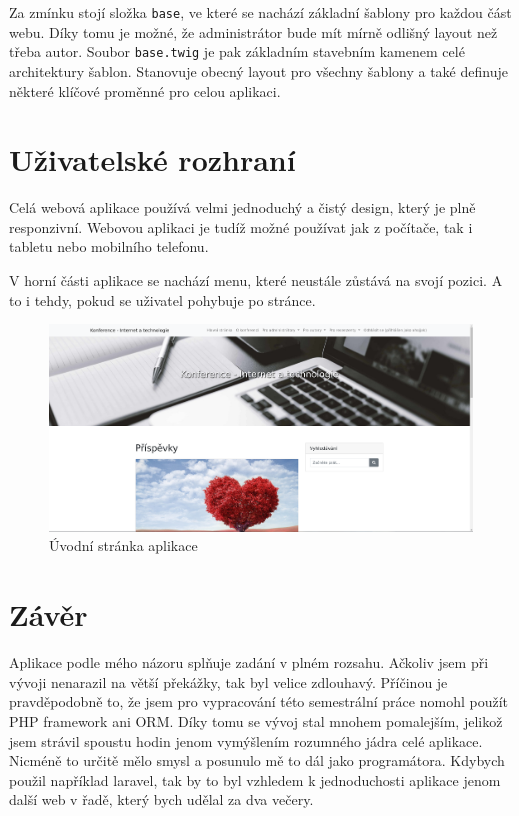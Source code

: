 \documentclass[12pt, a4paper]{article}
\begin{document}
	Za zmínku stojí složka {\tt base}, ve které se nachází základní šablony pro každou část webu. Díky tomu je možné, že administrátor bude mít mírně odlišný layout než třeba autor. Soubor {\tt base.twig} je pak základním stavebním kamenem celé architektury šablon. Stanovuje obecný layout pro všechny šablony a také definuje některé klíčové proměnné pro celou aplikaci.

	\section{Uživatelské rozhraní}
	Celá webová aplikace používá velmi jednoduchý a čistý design, který je plně responzivní. Webovou aplikaci je tudíž možné používat jak z počítače, tak i tabletu nebo mobilního telefonu.

	V horní části aplikace se nachází menu, které neustále zůstává na svojí pozici. A to i tehdy, pokud se uživatel pohybuje po stránce. 

	\begin{figure}[H]
		\includegraphics[width=\textwidth]{index_page.png}
		\caption{Úvodní stránka aplikace} \label{index_page}
	\end{figure}

	\section{Závěr}
	Aplikace podle mého názoru splňuje zadání v plném rozsahu. Ačkoliv jsem při vývoji nenarazil na větší překážky, tak byl velice zdlouhavý. Příčinou je pravděpodobně to, že jsem pro vypracování této semestrální práce nomohl použít PHP framework ani ORM. Díky tomu se vývoj stal mnohem pomalejším, jelikož jsem strávil spoustu hodin jenom vymýšlením rozumného jádra celé aplikace. Nicméně to určitě mělo smysl a posunulo mě to dál jako programátora. Kdybych použil například laravel, tak by to byl vzhledem k jednoduchosti aplikace jenom další web v řadě, který bych udělal za dva večery.
\end{document}
